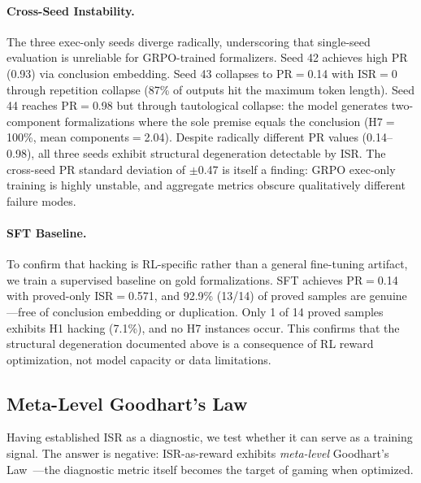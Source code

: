 \paragraph{Cross-Seed Instability.}
The three exec-only seeds diverge radically, underscoring that single-seed evaluation is unreliable for GRPO-trained formalizers. Seed 42 achieves high PR (0.93) via conclusion embedding. Seed 43 collapses to PR$=$0.14 with ISR$=$0 through repetition collapse (87\% of outputs hit the maximum token length). Seed 44 reaches PR$=$0.98 but through tautological collapse: the model generates two-component formalizations where the sole premise equals the conclusion (H7$=$100\%, mean components$=$2.04). Despite radically different PR values (0.14--0.98), all three seeds exhibit structural degeneration detectable by ISR. The cross-seed PR standard deviation of $\pm$0.47 is itself a finding: GRPO exec-only training is highly unstable, and aggregate metrics obscure qualitatively different failure modes.

\paragraph{SFT Baseline.}
To confirm that hacking is RL-specific rather than a general fine-tuning artifact, we train a supervised baseline on gold formalizations. SFT achieves PR$=$0.14 with proved-only ISR$=$0.571, and 92.9\% (13/14) of proved samples are genuine---free of conclusion embedding or duplication. Only 1 of 14 proved samples exhibits H1 hacking (7.1\%), and no H7 instances occur. This confirms that the structural degeneration documented above is a consequence of RL reward optimization, not model capacity or data limitations.

\subsection{Meta-Level Goodhart's Law}
\label{sec:goodhart}

Having established ISR as a diagnostic, we test whether it can serve as a training signal. The answer is negative: ISR-as-reward exhibits \emph{meta-level} Goodhart's Law~\cite{manheim-goodhart-taxonomy}---the diagnostic metric itself becomes the target of gaming when optimized.

